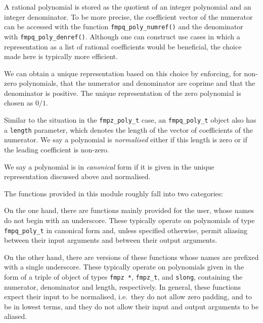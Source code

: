 \documentclass[a4paper,10pt]{book}
\newcommand{\code}{\lstinline}
\begin{document}
{{A rational polynomial is stored as the quotient of an integer polynomial
and an integer denominator.  To be more precise, the coefficient vector
of the numerator can be accessed with the function \code{fmpq_poly_numref()}
and the denominator with \code{fmpq_poly_denref()}.  Although one can
construct use cases in which a representation as a list of rational
coefficients would be beneficial, the choice made here is typically
more efficient.

We can obtain a unique representation based on this choice by enforcing,
for non-zero polynomials, that the numerator and denominator are coprime
and that the denominator is positive.  The unique representation of the
zero polynomial is chosen as $0/1$.

Similar to the situation in the \code{fmpz_poly_t} case, an
\code{fmpq_poly_t} object also has a \code{length} parameter, which
denotes the length of the vector of coefficients of the numerator.
We say a polynomial is \emph{normalised} either if this length is zero
or if the leading coefficient is non-zero.

We say a polynomial is in \emph{canonical} form if it is given in the
unique representation discussed above and normalised.

The functions provided in this module roughly fall into two categories:

On the one hand, there are functions mainly provided for the user, whose
names do not begin with an underscore.  These typically operate on
polynomials of type \code{fmpq_poly_t} in canonical form and, unless
specified otherwise, permit aliasing between their input arguments and
between their output arguments.

On the other hand, there are versions of these functions whose names are
prefixed with a single underscore.  These typically operate on polynomials
given in the form of a triple of object of types \code{fmpz *},
\code{fmpz_t}, and \code{slong}, containing the numerator, denominator and
length, respectively.  In general, these functions expect their input to
be normalised, i.e.\ they do not allow zero padding, and to be in lowest
terms, and they do not allow their input and output arguments to be aliased.




}}
\end{document}
